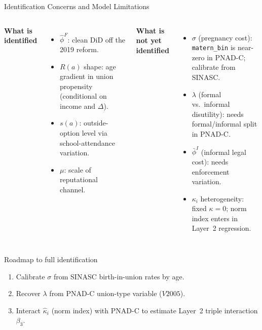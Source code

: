 \begin{frame}{Identification Concerns and Model Limitations}
    \begin{columns}[T]
        \textbf{What is identified}
        \begin{itemize}\small
            \item $\hat\phi^F$: clean DiD off the 2019 reform.
            \item $R(a)$ shape: age gradient in union propensity
                  (conditional on income and $\Delta$).
            \item $s(a)$: outside-option level via
                  school-attendance variation.
            \item $\mu$: scale of reputational channel.
        \end{itemize}

        \textbf{What is not yet identified}
        \begin{itemize}\small
            \item $\sigma$ (pregnancy cost): \texttt{matern\_bin}
                  is near-zero in PNAD-C; calibrate from SINASC.
            \item $\lambda$ (formal vs.\ informal disutility):
                  needs formal/informal split in PNAD-C.
            \item $\bar\phi^I$ (informal legal cost):
                  needs enforcement variation.
            \item $\kappa_i$ heterogeneity: fixed $\kappa=0$;
                  norm index enters in Layer~2 regression.
        \end{itemize}
    \end{columns}

    \vspace{0.3cm}
    \begin{block}{Roadmap to full identification}
        \begin{enumerate}\small
            \item Calibrate $\sigma$ from SINASC birth-in-union rates by age.
            \item Recover $\lambda$ from PNAD-C union-type variable ($V2005$).
            \item Interact $\hat\kappa_i$ (norm index) with PNAD-C to
                  estimate Layer~2 triple interaction $\beta_3$.
        \end{enumerate}
    \end{block}
\end{frame}
